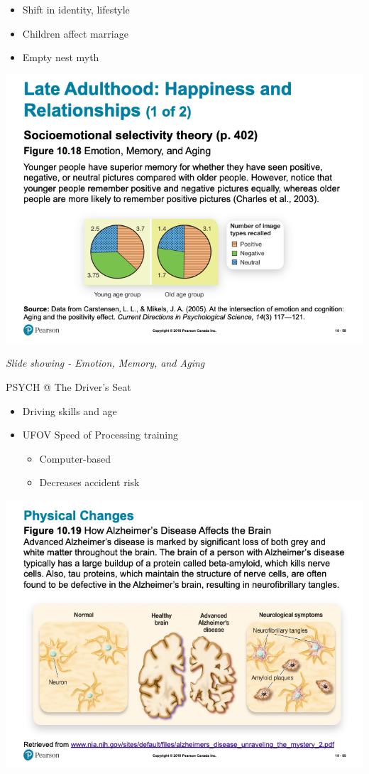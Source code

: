 \documentclass[
]{book}
\providecommand{\tightlist}{%
  \setlength{\itemsep}{0pt}\setlength{\parskip}{0pt}}
\begin{document}
\begin{reflect}
\begin{itemize}
\tightlist
\item
  Shift in identity, lifestyle
\item
  Children affect marriage
\item
  Empty nest myth
\end{itemize}

\includegraphics{assets/unit_3/slide_58.png}

\emph{Slide showing - Emotion, Memory, and Aging}

PSYCH @ The Driver's Seat

\begin{itemize}
\tightlist
\item
  Driving skills and age
\item
  UFOV Speed of Processing training

  \begin{itemize}
  \tightlist
  \item
    Computer-based
  \item
    Decreases accident risk
  \end{itemize}
\end{itemize}

\includegraphics{assets/unit_3/slide_60.png}


\end{reflect}
\end{document}
